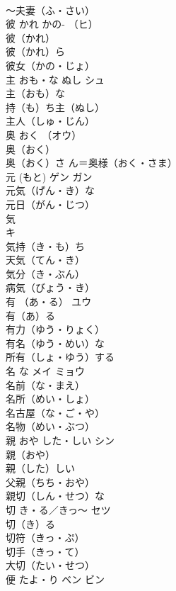 \documentclass[8pt]{extreport}
\begin{document}
\begin{CJK}{UTF8}{min}
\\	～夫妻（ふ・さい）　
\\	彼	かれ かの-	（ヒ）	
\\	彼（かれ）　
\\	彼（かれ）ら　
\\	彼女（かの・じょ）　
\\	主	おも・な ぬし	シュ	
\\	主（おも）な　
\\	持（も）ち主（ぬし）　
\\	主人（しゅ・じん）　
\\	奥	おく	（オウ）	
\\	奥（おく）　
\\	奥（おく）さ ん＝奥様（おく・さま）　
\\	元	(もと)	ゲン ガン	
\\	元気（げん・き）な　
\\	元日（がん・じつ）　
\\	気	
\\	キ	
\\	気持（き・も）ち　
\\	天気（てん・き）　
\\	気分（き・ぶん）　
\\	病気（びょう・き）　
\\	有	（あ・る）	ユウ	
\\	有（あ）る　
\\	有力（ゆう・りょく）　
\\	有名（ゆう・めい）な　
\\	所有（しょ・ゆう）する　
\\	名	な	メイ ミョウ	
\\	名前（な・まえ）　
\\	名所（めい・しょ）　
\\	名古屋（な・ご・や）　
\\	名物（めい・ぶつ）　
\\	親	おや した・しい	シン	
\\	親（おや）　
\\	親（した）しい　
\\	父親（ちち・おや）　
\\	親切（しん・せつ）な　
\\	切	き・る／きっ～	セツ	
\\	切（き）る　
\\	切符（きっ・ぷ）　
\\	切手（きっ・て）　
\\	大切（たい・せつ）　
\\	便	たよ・り	ベン ビン	

\end{CJK}
\end{document}
